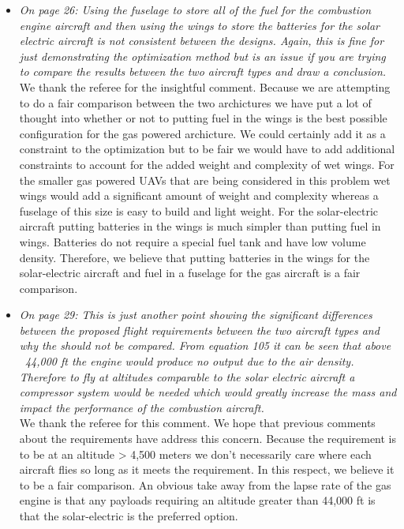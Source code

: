 \documentclass[10pt, a4paper]{article}
\begin{document}
\begin{itemize}
    \item \emph{On page 26: Using the fuselage to store all of the fuel for the combustion engine aircraft and then using the wings to store the batteries for the solar electric aircraft is not consistent between the designs. Again, this is fine for just demonstrating the optimization method but is an issue if you are trying to compare the results between the two aircraft types and draw a conclusion.} \\

        We thank the referee for the insightful comment.  Because we are attempting to do a fair comparison between the two archictures we have put a lot of thought into whether or not to putting fuel in the wings is the best possible configuration for the gas powered archicture.  We could certainly add it as a constraint to the optimization but to be fair we would have to add additional constraints to account for the added weight and complexity of wet wings.  For the smaller gas powered UAVs that are being considered in this problem wet wings would add a significant amount of weight and complexity whereas a fuselage of this size is easy to build and light weight.  For the solar-electric aircraft putting batteries in the wings is much simpler than putting fuel in wings.  Batteries do not require a special fuel tank and have low volume density.  Therefore, we believe that putting batteries in the wings for the solar-electric aircraft and fuel in a fuselage for the gas aircraft is a fair comparison. 

    \item \emph{On page 29: This is just another point showing the significant differences between the proposed flight requirements between the two aircraft types and why the should not be compared. From equation 105 it can be seen that above ~44,000 ft the engine would produce no output due to the air density. Therefore to fly at altitudes comparable to the solar electric aircraft a compressor system would be needed which would greatly increase the mass and impact the performance of the combustion aircraft.} \\

        We thank the referee for this comment.  We hope that previous comments about the requirements have address this concern.  Because the requirement is to be at an altitude > 4,500 meters we don't necessarily care where each aircraft flies so long as it meets the requirement.  In this respect, we believe it to be a fair comparison.  An obvious take away from the lapse rate of the gas engine is that any payloads requiring an altitude greater than 44,000 ft is that the solar-electric is the preferred option. 


\end{itemize}
\end{document}
